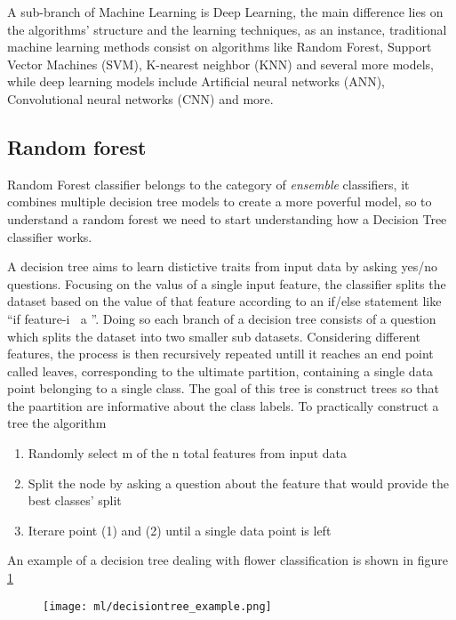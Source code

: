 \documentclass[a4paper,11pt]{article}
\begin{document}
A sub-branch of Machine Learning is Deep Learning, the main difference lies on the algorithms' structure and the learning techniques, as an instance, traditional machine learning methods consist on algorithms like Random Forest, Support Vector Machines (SVM), K-nearest neighbor (KNN) and several more models, while deep learning models include Artificial neural networks (ANN), Convolutional neural networks (CNN) and more.

\subsection{Random forest}
Random Forest classifier belongs to the category of \emph{ensemble} classifiers, it combines multiple decision tree models to create a more poverful model, so to understand a random forest we need to start understanding how a Decision Tree classifier works.

A decision tree aims to learn distictive traits from input data by asking yes/no questions. Focusing on the valus of a single input feature, the classifier splits the dataset based on the value of that feature according to an if/else statement like \textquotedblleft if feature-i $\>$ a \textquotedblright.
Doing so each branch of a decision tree consists of a question which splits the dataset into two smaller sub datasets.
Considering different features, the process is then recursively repeated untill it reaches an end point called leaves, corresponding to the ultimate partition, containing a single data point belonging to a single class.
The goal of this tree is construct trees so that the paartition are informative about the class labels.
To practically construct a tree the algorithm
\begin{enumerate}
\item Randomly select m of the n total features from input data
\item Split the node by asking a question about the feature that would provide the best classes' split
\item Iterare point (1) and (2) until a single data point is left
\end{enumerate}

An example of a decision tree dealing with flower classification is shown in figure \ref{fig:decisiontree}
\begin{figure}
\centering
\texttt{[image: ml/decisiontree\_example.png]}
\caption{}
\label{fig:decisiontree}
\end{figure}
\end{document}
